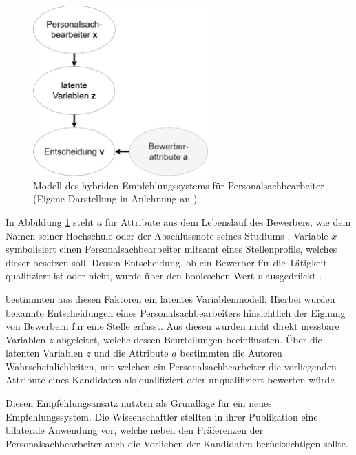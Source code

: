 \begin{figure}[h]
	\centering
	\includegraphics[width=0.6\textwidth]{gfx/faerber.jpg}
	\caption[Modell des hybriden Empfehlungssystems für Personalsachbearbeiter]{Modell des hybriden Empfehlungssystems für Personalsachbearbeiter\\
	(Eigene Darstellung in Anlehnung an \cite[S. 8]{faerber:2003})}
	\label{fig:verwandteArbeiten:abb1}
\end{figure}

In Abbildung \ref{fig:verwandteArbeiten:abb1} steht $a$ für Attribute aus dem Lebenslauf des Bewerbers, wie dem Namen seiner Hochschule oder der Abschlussnote seines Studiums \cite[S. 4]{malinowski:2006}. Variable $x$ symbolisiert einen Personalsachbearbeiter mitsamt eines Stellenprofils, welches dieser besetzen soll. Dessen Entscheidung, ob ein Bewerber für die Tätigkeit qualifiziert ist oder nicht, wurde über den booleschen Wert $v$ ausgedrückt \cite[S. 6ff.]{faerber:2003}.

\textcite[S. 4ff.]{faerber:2003} bestimmten aus diesen Faktoren ein latentes Variablenmodell. Hierbei wurden bekannte Entscheidungen eines Personalsachbearbeiters hinsichtlich der Eignung von Bewerbern für eine Stelle erfasst. Aus diesen wurden nicht direkt messbare Variablen $z$ abgeleitet, welche dessen Beurteilungen beeinflussten. Über die latenten Variablen $z$ und die Attribute $a$ bestimmten die Autoren Wahrscheinlichkeiten, mit welchen ein Personalsachbearbeiter die vorliegenden Attribute eines Kandidaten als qualifiziert oder unqualifiziert bewerten würde \cite[S. 4ff.]{faerber:2003}.

Diesen Empfehlungsansatz nutzten \textcite[S. 4f.]{malinowski:2006} als Grundlage für ein neues Empfehlungssystem. Die Wissenschaftler stellten in ihrer Publikation eine bilaterale Anwendung vor, welche neben den Präferenzen der Personalsachbearbeiter auch die Vorlieben der Kandidaten berücksichtigen sollte.

